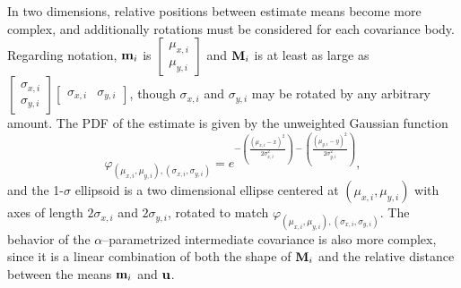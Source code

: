 In two dimensions, relative positions between estimate means become more complex, and additionally rotations must be
considered for each covariance body. Regarding notation, $\mathbf{m}_i$ is
$\left[\begin{smallmatrix}\mu_{x,i}\\\mu_{y,i}\end{smallmatrix}\right]$ and $\mathbf{M}_i$ is at least as large as
$\left[\begin{smallmatrix}\sigma_{x,i}\\\sigma_{y,i}\end{smallmatrix}\right]
 \left[\begin{smallmatrix}\sigma_{x,i}&\sigma_{y,i}\end{smallmatrix}\right]$, though $\sigma_{x,i}$ and $\sigma_{y,i}$
may be rotated by any arbitrary amount. The PDF of the estimate is given by the unweighted Gaussian function
\begin{equation}\label{eqn:gauss2d}
    \varphi_{(\mu_{x,i},\mu_{y,i}),(\sigma_{x,i},\sigma_{y,i})} = 
        e^{-\left(\frac{(\mu_{x,i}-x)^2}{2\sigma_{x,i}^2}\right)-\left(\frac{(\mu_{y,i}-y)^2}{2\sigma_{y,i}^2}\right)},
\end{equation}
and the 1-$\sigma$ ellipsoid is a two dimensional ellipse centered at $(\mu_{x,i},\mu_{y,i})$ with axes of length
$2\sigma_{x,i}$ and $2\sigma_{y,i}$, rotated to match $\varphi_{(\mu_{x,i},\mu_{y,i}),(\sigma_{x,i},\sigma_{y,i})}$. The
behavior of the $\alpha$--parametrized intermediate covariance is also more complex, since it is a linear combination
of both the shape of $\mathbf{M}_i$ and the relative distance between the means $\mathbf{m}_i$ and $\mathbf{u}$.


